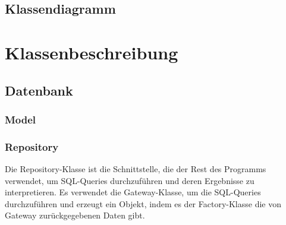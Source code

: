 \documentclass[a4paper,12pt]{article}
\begin{document}
\clearpage
\subsection{Klassendiagramm}





\clearpage
\section{Klassenbeschreibung}

\subsection{Datenbank}
\subsubsection{Model}

\subsubsection{Repository}

Die Repository-Klasse ist die Schnittstelle, die der Rest des Programms verwendet, um SQL-Queries durchzuführen und deren Ergebnisse zu interpretieren. Es verwendet die Gateway-Klasse, um die SQL-Queries durchzuführen und erzeugt ein Objekt, indem es der Factory-Klasse die von Gateway zurückgegebenen Daten gibt.
\end{document}
